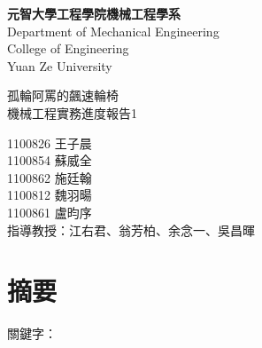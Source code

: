 \documentclass[12pt]{article}       %
\begin{document}
\begin{titlepage}
    \centering
    \vspace*{1cm} %

    {\LARGE \textbf{元智大學工程學院機械工程學系}} \\[0.5cm] %
    {\LARGE {Department of Mechanical Engineering}} \\[0.5cm] %
    {\LARGE {College of Engineering}} \\[0.5cm]
    {\LARGE {Yuan Ze University}}

    \vfill %

    {\LARGE{孤輪阿罵的飆速輪椅}} \\[0.5cm]%
    {\LARGE{機械工程實務進度報告1}} %

    \vfill %

    {\LARGE {1100826 王子晨}}\\[0.5cm]
    {\LARGE {1100854 蘇威全}}\\[0.5cm]
    {\LARGE {1100862 施廷翰}}\\[0.5cm]
    {\LARGE {1100812 魏羽暘}}\\[0.5cm]
    {\LARGE {1100861 盧昀序}}\\[2.5cm]
    {\LARGE {指導教授：江右君、翁芳柏、余念一、吳昌暉}}\\[0.5cm]

\end{titlepage}
\newpage

\setcounter{page}{1}  %


\section*{\centering 摘要}  %


\hspace{2em}

\vspace{1.5em}
\noindent 關鍵字：
\newpage  %
\end{document}
